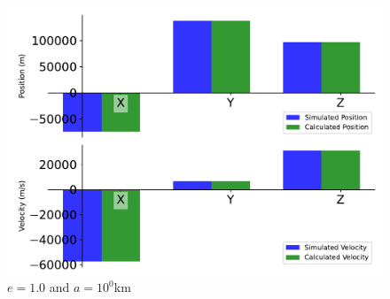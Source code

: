 \begin{figure}[htbp]\centerline{\includegraphics[height=0.7\textwidth, keepaspectratio]{AutoTeX/IncPara_2}}\caption{$e = 1.0$ and $a = 10^0$km}\label{fig:IncPara_2}\end{figure}